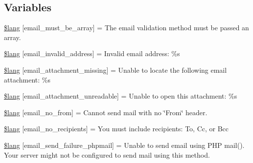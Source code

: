 \subsection*{Variables}
\begin{DoxyCompactItemize}
\item 
\hyperlink{_admin_2system_2language_2english_2email__lang_8php_ac8c4b077e854bbdbb9a37b2d7f7c47fc}{\$lang} \mbox{[}\textquotesingle{}email\+\_\+must\+\_\+be\+\_\+array\textquotesingle{}\mbox{]} = \textquotesingle{}The email validation method must be passed an array.\textquotesingle{}
\item 
\hyperlink{_admin_2system_2language_2english_2email__lang_8php_a37759f6c728f3aaf8df6ca5bb8a3e832}{\$lang} \mbox{[}\textquotesingle{}email\+\_\+invalid\+\_\+address\textquotesingle{}\mbox{]} = \textquotesingle{}Invalid email address\+: \%s\textquotesingle{}
\item 
\hyperlink{_admin_2system_2language_2english_2email__lang_8php_a09c0c415b48ef267bf9e36b555be67d9}{\$lang} \mbox{[}\textquotesingle{}email\+\_\+attachment\+\_\+missing\textquotesingle{}\mbox{]} = \textquotesingle{}Unable to locate the following email attachment\+: \%s\textquotesingle{}
\item 
\hyperlink{_admin_2system_2language_2english_2email__lang_8php_acae2e9f7ade1ac9c6b67db0ff752414e}{\$lang} \mbox{[}\textquotesingle{}email\+\_\+attachment\+\_\+unreadable\textquotesingle{}\mbox{]} = \textquotesingle{}Unable to open this attachment\+: \%s\textquotesingle{}
\item 
\hyperlink{_admin_2system_2language_2english_2email__lang_8php_a43fdb34364c17ce52df6c00d9da25f3d}{\$lang} \mbox{[}\textquotesingle{}email\+\_\+no\+\_\+from\textquotesingle{}\mbox{]} = \textquotesingle{}Cannot send mail with no \char`\"{}From\char`\"{} header.\textquotesingle{}
\item 
\hyperlink{_admin_2system_2language_2english_2email__lang_8php_a8f9d5a049f4dd899d4e61f6d56be5071}{\$lang} \mbox{[}\textquotesingle{}email\+\_\+no\+\_\+recipients\textquotesingle{}\mbox{]} = \textquotesingle{}You must include recipients\+: To, Cc, or Bcc\textquotesingle{}
\item 
\hyperlink{_admin_2system_2language_2english_2email__lang_8php_a99a2ce89426340b4c96a245b7874a99d}{\$lang} \mbox{[}\textquotesingle{}email\+\_\+send\+\_\+failure\+\_\+phpmail\textquotesingle{}\mbox{]} = \textquotesingle{}Unable to send email using P\+H\+P mail(). Your server might not be configured to send mail using this method.\textquotesingle{}
\item 

\end{DoxyCompactItemize}

